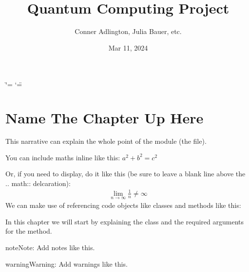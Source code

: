 \documentclass[letterpaper,10pt,english]{sphinxmanual}
\title{Quantum Computing Project}
\date{Mar 11, 2024}
\author{
Conner Adlington, Julia Bauer, etc.\@{} 
}
\begin{document}
\ifdefined\shorthandoff
  \ifnum\catcode`\=\string=\active\shorthandoff{=}\fi
  \ifnum\catcode`\"=\active{}\fi
\fi

\pagestyle{empty}
\sphinxmaketitle
\pagestyle{plain}
\sphinxtableofcontents
\pagestyle{normal}
\label{\detokenize{index::doc}}


\chapter{Name The Chapter Up Here}
\label{\detokenize{index:name-the-chapter-up-here}}\label{\detokenize{index:module-example}}
\sphinxAtStartPar
This narrative can explain the whole point of the module (the file).

\sphinxAtStartPar
You can include maths inline like this: \(a^2 + b^2 = c^2\)

\sphinxAtStartPar
Or, if you need to display, do it like this (be sure to leave a blank line
above the .. math:: delcaration):
\begin{equation*}
\begin{split}\lim_{n\to\infty} \frac{1}{n} \neq \infty\end{split}
\end{equation*}
\sphinxAtStartPar
We can make use of referencing code objects like classes and methods
like this:

\sphinxAtStartPar
In this chapter we will start by explaining the {\hyperref[\detokenize{index:example.Example}]{}} class
and the required arguments for the  method.

\begin{sphinxadmonition}{note}{Note:}
\sphinxAtStartPar
Add notes like this.
\end{sphinxadmonition}

\begin{sphinxadmonition}{warning}{Warning:}
\sphinxAtStartPar
Add warnings like this.
\end{sphinxadmonition}
\end{document}
